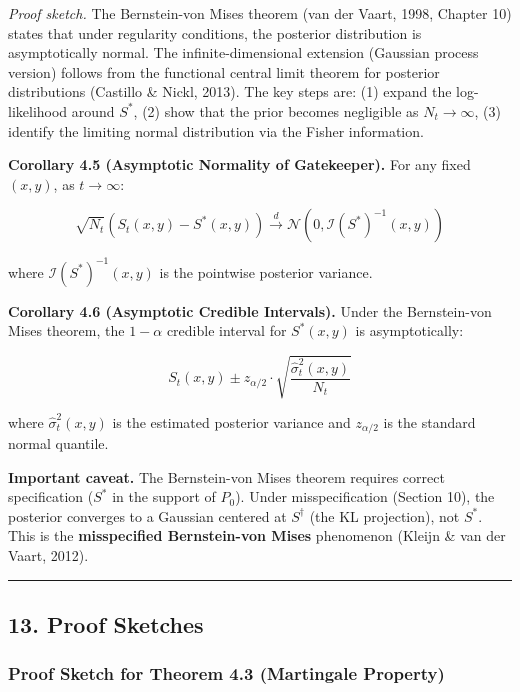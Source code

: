 \documentclass[
  12pt,
]{article}
\begin{document}
\emph{Proof sketch.} The Bernstein-von Mises theorem (van der Vaart,
1998, Chapter 10) states that under regularity conditions, the posterior
distribution is asymptotically normal. The infinite-dimensional
extension (Gaussian process version) follows from the functional central
limit theorem for posterior distributions (Castillo \& Nickl, 2013). The
key steps are: (1) expand the log-likelihood around \(S^*\), (2) show
that the prior becomes negligible as \(N_t \to \infty\), (3) identify
the limiting normal distribution via the Fisher information.

\textbf{Corollary 4.5 (Asymptotic Normality of Gatekeeper).} For any
fixed \((x,y)\), as \(t \to \infty\):

\[
\sqrt{N_t} (S_t(x,y) - S^*(x,y)) \xrightarrow{d} \mathcal{N}(0, \mathcal{I}(S^*)^{-1}(x,y))
\]

where \(\mathcal{I}(S^*)^{-1}(x,y)\) is the pointwise posterior
variance.

\textbf{Corollary 4.6 (Asymptotic Credible Intervals).} Under the
Bernstein-von Mises theorem, the \(1-\alpha\) credible interval for
\(S^*(x,y)\) is asymptotically:

\[
S_t(x,y) \pm z_{\alpha/2} \cdot \sqrt{\frac{\hat{\sigma}^2_t(x,y)}{N_t}}
\]

where \(\hat{\sigma}^2_t(x,y)\) is the estimated posterior variance and
\(z_{\alpha/2}\) is the standard normal quantile.

\textbf{Important caveat.} The Bernstein-von Mises theorem requires
correct specification (\(S^*\) in the support of \(P_0\)). Under
misspecification (Section 10), the posterior converges to a Gaussian
centered at \(S^\dagger\) (the KL projection), not \(S^*\). This is the
\textbf{misspecified Bernstein-von Mises} phenomenon (Kleijn \& van der
Vaart, 2012).

\begin{center}\rule{0.5\linewidth}{0.5pt}\end{center}

\subsection{13. Proof Sketches}\label{proof-sketches}

\subsubsection{Proof Sketch for Theorem 4.3 (Martingale
Property)}\label{proof-sketch-for-theorem-4.3-martingale-property}
\end{document}

